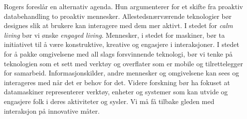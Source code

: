 {Rogers foreslår en alternativ agenda. Hun argumenterer for et skifte fra proaktiv databehandling to proaktiv mennesker. Allestedsnærværende teknologier bør designes slik at brukere kan interagere med dem mer aktivt. I stedet for \emph{calm living} bør vi ønske \emph{engaged living}. Mennesker, i stedet for maskiner, bør ta initiativet til å være konstruktive, kreative og engasjere i interaksjoner. I stedet for å pakke omgivelsene med all slags forsvinnende teknologi, bør vi tenke på teknologien som et sett med verktøy og overflater som er mobile og tilrettelegger for samarbeid. Informasjonskilder, andre mennesker og omgivelsene kan sees og interageres med når det er behov for det. Videre forskning bør ha fokuset at datamaskiner representerer verktøy, enheter og systemer som kan utvide og engasjere folk i deres aktiviteter og sysler. Vi må få tilbake gleden med interaksjon på innovative måter.
}

